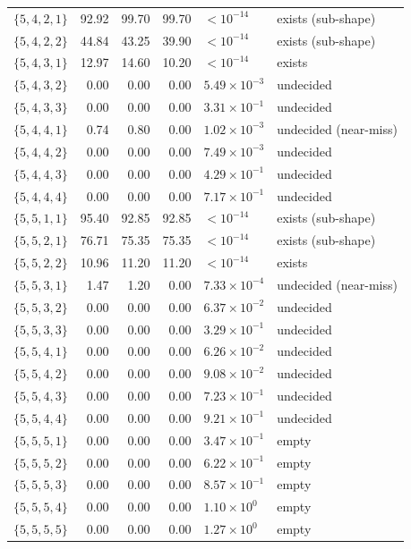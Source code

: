 \documentclass[11pt]{article}
\theoremstyle{definition}
\theoremstyle{remark}
\begin{document}
{\begin{longtable}{@{}lrrrll@{}}
$\{5,4,2,1\}$ & 92.92 & 99.70 & 99.70 & $<10^{-14}$ & exists (sub-shape)\\
$\{5,4,2,2\}$ & 44.84 & 43.25 & 39.90 & $<10^{-14}$ & exists (sub-shape)\\
$\{5,4,3,1\}$ & 12.97 & 14.60 & 10.20 & $<10^{-14}$ & exists \cite{CWT}\\
$\{5,4,3,2\}$ & 0.00 & 0.00 & 0.00 & $5.49\times10^{-3}$ & undecided\\
$\{5,4,3,3\}$ & 0.00 & 0.00 & 0.00 & $3.31\times10^{-1}$ & undecided\\
$\{5,4,4,1\}$ & 0.74 & 0.80 & 0.00 & $1.02\times10^{-3}$ & undecided (near-miss)\\
$\{5,4,4,2\}$ & 0.00 & 0.00 & 0.00 & $7.49\times10^{-3}$ & undecided\\
$\{5,4,4,3\}$ & 0.00 & 0.00 & 0.00 & $4.29\times10^{-1}$ & undecided\\
$\{5,4,4,4\}$ & 0.00 & 0.00 & 0.00 & $7.17\times10^{-1}$ & undecided\\
$\{5,5,1,1\}$ & 95.40 & 92.85 & 92.85 & $<10^{-14}$ & exists (sub-shape)\\
$\{5,5,2,1\}$ & 76.71 & 75.35 & 75.35 & $<10^{-14}$ & exists (sub-shape)\\
$\{5,5,2,2\}$ & 10.96 & 11.20 & 11.20 & $<10^{-14}$ & exists \cite{CWT}\\
$\{5,5,3,1\}$ & 1.47 & 1.20 & 0.00 & $7.33\times10^{-4}$ & undecided (near-miss)\\
$\{5,5,3,2\}$ & 0.00 & 0.00 & 0.00 & $6.37\times10^{-2}$ & undecided\\
$\{5,5,3,3\}$ & 0.00 & 0.00 & 0.00 & $3.29\times10^{-1}$ & undecided\\
$\{5,5,4,1\}$ & 0.00 & 0.00 & 0.00 & $6.26\times10^{-2}$ & undecided\\
$\{5,5,4,2\}$ & 0.00 & 0.00 & 0.00 & $9.08\times10^{-2}$ & undecided\\
$\{5,5,4,3\}$ & 0.00 & 0.00 & 0.00 & $7.23\times10^{-1}$ & undecided\\
$\{5,5,4,4\}$ & 0.00 & 0.00 & 0.00 & $9.21\times10^{-1}$ & undecided\\
$\{5,5,5,1\}$ & 0.00 & 0.00 & 0.00 & $3.47\times10^{-1}$ & empty \cite{CWT}\\
$\{5,5,5,2\}$ & 0.00 & 0.00 & 0.00 & $6.22\times10^{-1}$ & empty \cite{CWT}\\
$\{5,5,5,3\}$ & 0.00 & 0.00 & 0.00 & $8.57\times10^{-1}$ & empty \cite{CWT}\\
$\{5,5,5,4\}$ & 0.00 & 0.00 & 0.00 & $1.10\times10^{0}$ & empty \cite{CWT}\\
$\{5,5,5,5\}$ & 0.00 & 0.00 & 0.00 & $1.27\times10^{0}$ & empty \cite{CWT}\\
\end{longtable}
}
\end{document}
